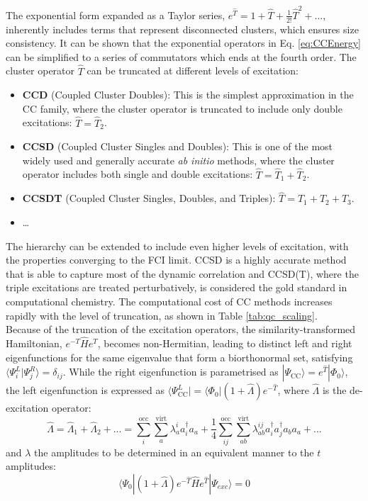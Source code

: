 The exponential form expanded as a Taylor series, $e^{\hat{T}} = 1 + \hat{T} + \frac{1}{2!} \hat{T}^2 + \dots$, inherently includes terms that represent disconnected clusters, which ensures size consistency. It can be shown that the exponential operators in Eq. \ref{eq:CCEnergy} can be simplified to a series of commutators which ends at the fourth order. The cluster operator $\hat{T}$ can be truncated at different levels of excitation:
\begin{itemize}
    \item \textbf{CCD} (Coupled Cluster Doubles): This is the simplest approximation in the CC family, where the cluster operator is truncated to include only double excitations: $\hat{T} = \hat{T}_2$. 
    \item \textbf{CCSD} (Coupled Cluster Singles and Doubles): This is one of the most widely used and generally accurate \textit{ab initio} methods, where the cluster operator includes both single and double excitations: $\hat{T} = \hat{T}_1 + \hat{T}_2$.
    \item \textbf{CCSDT} (Coupled Cluster Singles, Doubles, and Triples): $\hat{T} = \hat{T}_1 + \hat{T}_2 + \hat{T}_3$.
    \item \ldots
\end{itemize}
The hierarchy can be extended to include even higher levels of excitation,  with the properties converging to the FCI limit. CCSD is a highly accurate method that is able to capture most of the dynamic correlation and CCSD(T), where the triple excitations are treated perturbatively, is considered the gold standard in computational chemistry. The computational cost of CC methods increases rapidly with the level of truncation, as shown in Table \ref{tab:qc_scaling}.\\

Because of the truncation of the excitation operators, the similarity-transformed Hamiltonian, $e^{-T}\hat{H}e^T$, becomes non-Hermitian, leading to distinct left and right eigenfunctions for the same eigenvalue that form a biorthonormal set, satisfying $\langle \Psi_i^L | \Psi_j^R \rangle = \delta_{ij}$. While the right eigenfunction is parametrised as $|\Psi_{\text{CC}}\rangle = e^{\hat{T}}|\Phi_0\rangle$, the left eigenfunction is expressed as $\langle\Psi_{\text{CC}}^L| = \langle\Phi_0|(1 + \hat{\Lambda})e^{-\hat{T}}$, where $\hat{\Lambda}$ is the de-excitation operator:
\begin{equation}\label{eq:Lambda}
    \hat{\Lambda} = \hat{\Lambda}_1 + \hat{\Lambda}_2 + ... = \sum_i^{\text{occ}}\sum_a^{\text{virt}} \lambda_a^i a_i^{\dagger}a_a + \frac{1}{4}\sum_{ij}^{\text{occ}}\sum_{ab}^{\text{virt}} \lambda_{ab}^{ij}a_i^{\dagger}a_j^{\dagger}a_b a_a + ...
\end{equation}
and $\lambda$ the amplitudes to be determined in an equivalent manner to the $t$ amplitudes:
\begin{equation}
        \langle\Psi_0|(1 + \hat{\Lambda})e^{-\hat{T}}\hat{H}e^{\hat{T}}|\Psi_{exc}\rangle = 0
\end{equation}


